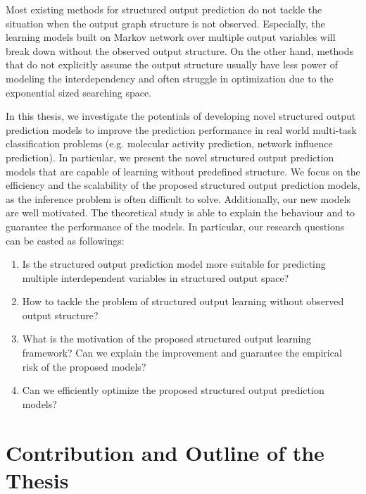 Most existing methods for structured output prediction do not tackle the situation when the output graph structure is not observed.
Especially, the learning models built on Markov network over multiple output variables will break down without the observed output structure.
On the other hand, methods that do not explicitly assume the output structure usually have less power of modeling the interdependency and often struggle in optimization due to the exponential sized searching space.

In this thesis, we investigate the potentials of developing novel structured output prediction models to improve the prediction performance in real world multi-task classification problems (e.g. molecular activity prediction, network influence prediction).
In particular, we present the novel structured output prediction models that are capable of learning without predefined structure.
We focus on the efficiency and the scalability of the proposed structured output prediction models, as the inference problem is often difficult to solve.
Additionally, our new models are well motivated.
The theoretical study is able to explain the behaviour and to guarantee the performance of the models.
In particular, our research questions can be casted as followings:
\begin{enumerate}[label=\textbf{Q \Roman*}:]
\item Is the structured output prediction model more suitable for predicting multiple interdependent variables in structured output space?
\item How to tackle the problem of structured output learning without observed output structure?
\item What is the motivation of the proposed structured output learning framework? Can we explain the improvement and guarantee the empirical risk of the proposed models?
\item Can we efficiently optimize the proposed structured output prediction models?
\end{enumerate}



%
%
\section{Contribution and Outline of the Thesis}

